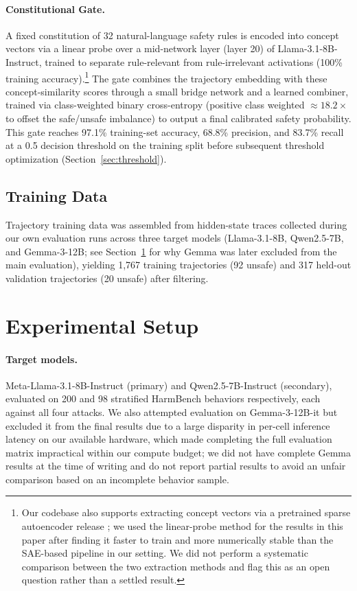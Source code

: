 \documentclass[11pt]{article}
\begin{document}
\paragraph{Constitutional Gate.} A fixed constitution of 32 natural-language safety rules is encoded into concept vectors via a linear probe over a mid-network layer (layer 20) of Llama-3.1-8B-Instruct, trained to separate rule-relevant from rule-irrelevant activations (100\% training accuracy).\footnote{Our codebase also supports extracting concept vectors via a pretrained sparse autoencoder release \citep{cunningham2023sae}; we used the linear-probe method for the results in this paper after finding it faster to train and more numerically stable than the SAE-based pipeline in our setting. We did not perform a systematic comparison between the two extraction methods and flag this as an open question rather than a settled result.} The gate combines the trajectory embedding with these concept-similarity scores through a small bridge network and a learned combiner, trained via class-weighted binary cross-entropy (positive class weighted $\approx 18.2\times$ to offset the safe/unsafe imbalance) to output a final calibrated safety probability. This gate reaches 97.1\% training-set accuracy, 68.8\% precision, and 83.7\% recall at a 0.5 decision threshold on the training split before subsequent threshold optimization (Section~\ref{sec:threshold}).

\subsection{Training Data}

Trajectory training data was assembled from hidden-state traces collected during our own evaluation runs across three target models (Llama-3.1-8B, Qwen2.5-7B, and Gemma-3-12B; see Section~\ref{sec:setup} for why Gemma was later excluded from the main evaluation), yielding 1{,}767 training trajectories (92 unsafe) and 317 held-out validation trajectories (20 unsafe) after filtering.

\section{Experimental Setup}
\label{sec:setup}

\paragraph{Target models.} Meta-Llama-3.1-8B-Instruct (primary) and Qwen2.5-7B-Instruct (secondary), evaluated on 200 and 98 stratified HarmBench behaviors respectively, each against all four attacks. We also attempted evaluation on Gemma-3-12B-it but excluded it from the final results due to a large disparity in per-cell inference latency on our available hardware, which made completing the full evaluation matrix impractical within our compute budget; we did not have complete Gemma results at the time of writing and do not report partial results to avoid an unfair comparison based on an incomplete behavior sample.
\end{document}
